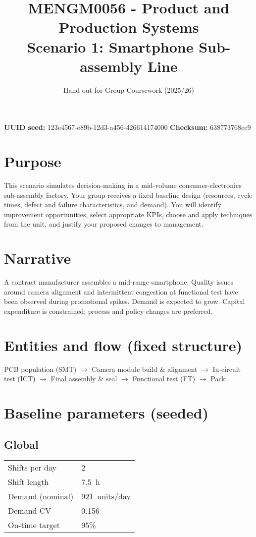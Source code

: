 \documentclass[11pt,a4paper]{article}
\title{MENGM0056 - Product and Production Systems\\Scenario 1: Smartphone Sub-assembly Line}
\author{Hand-out for Group Coursework (2025/26)}
\date{}
\begin{document}
\maketitle

\noindent \textbf{UUID seed:} 123e4567-e89b-12d3-a456-426614174000 \quad \textbf{Checksum:} 638773768ce9

\section*{Purpose}
This scenario simulates decision-making in a mid-volume consumer-electronics sub-assembly factory. Your group receives a fixed baseline design (resources, cycle times, defect and failure characteristics, and demand). You will identify improvement opportunities, select appropriate KPIs, choose and apply techniques from the unit, and justify your proposed changes to management.

\section*{Narrative}
A contract manufacturer assembles a mid-range smartphone. Quality issues around camera alignment and intermittent congestion at functional test have been observed during promotional spikes. Demand is expected to grow. Capital expenditure is constrained; process and policy changes are preferred.

\section*{Entities and flow (fixed structure)}
PCB population (SMT) $\rightarrow$ Camera module build \& alignment $\rightarrow$ In-circuit test (ICT) $\rightarrow$ Final assembly \& seal $\rightarrow$ Functional test (FT) $\rightarrow$ Pack.

\section*{Baseline parameters (seeded)}
\subsection*{Global}
\begin{tabular}{@{}ll@{}}
\toprule
Shifts per day & 2 \\
Shift length & 7.5~h \\
Demand (nominal) & 921~units/day \\
Demand CV & 0.156 \\
On-time target & 95\% \\
\bottomrule
\end{tabular}
\end{document}
